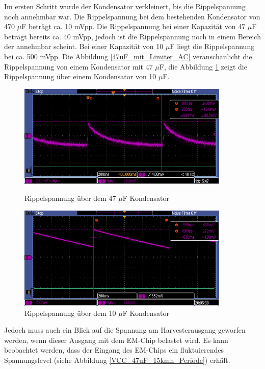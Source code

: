 Im ersten Schritt wurde der Kondensator verkleinert, bis die Rippelspannung noch annehmbar war. Die Rippelspannung bei dem bestehenden Kondensator von 470 $\mu$F beträgt ca. 10 mVpp. Die Rippelspannung bei einer Kapazität von 47 $\mu$F beträgt bereits ca. 40 mVpp, jedoch ist die Rippelspannung noch in einem Bereich der annehmbar scheint. Bei einer Kapazität von 10 $\mu$F liegt die Rippelspannung bei ca. 500 mVpp. Die Abbildung \ref{47uF_mit_Limiter_AC} veranschaulicht die Rippelspannung von einem Kondensator mit 47 $\mu$F, die Abbildung \ref{10uF_mit_Limiter_DC} zeigt die Rippelspannung über einem Kondensator von 10 $\mu$F.

\begin{figure}[ht]
 \begin{minipage}[t]{0.5\textwidth}
    \includegraphics[width=0.90\textwidth]{3Vorgehen/imag/47uF_mit_Limiter_AC.PNG}
    \caption{Rippelspannung über dem 47 $\mu$F Kondensator}
	\label{47uF_mit_Limiter_AC} 
 \end{minipage}
 \begin{minipage}[t]{0.5\textwidth}
    \includegraphics[width=0.90\textwidth]{3Vorgehen/imag/10uF_mit_Limiter_DC.PNG}
    \caption{Rippelspannung über dem 10 $\mu$F Kondensator}
	\label{10uF_mit_Limiter_DC} 
 \end{minipage}
\end{figure}

Jedoch muss auch ein Blick auf die Spannung am Harvesterausgang geworfen werden, wenn dieser Ausgang mit dem EM-Chip belastet wird. Es kann beobachtet werden, dass der Eingang des EM-Chips ein fluktuierendes Spannungslevel (siehe Abbildung \ref{VCC_47uF_15kmh_Periode}) erhält. 

